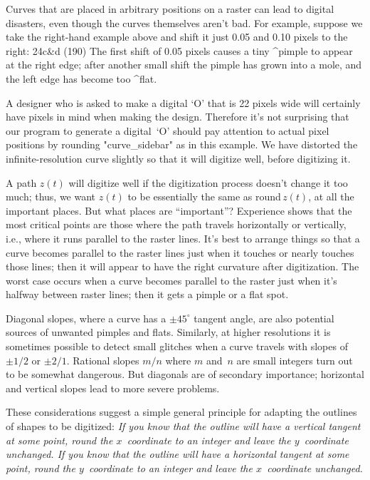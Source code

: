 \danger Curves that are placed in arbitrary positions on
a raster can lead to digital disasters, even though the curves themselves
aren't bad. For example, suppose we take the right-hand example above
and shift it just 0.05 and 0.10 pixels to the right:
\displayfig 24c\&d (190\apspix)
The first shift of 0.05 pixels causes a tiny ^{pimple} to appear
at the right edge; after another small shift the pimple has grown into a
mole, and the left edge has become too ^{flat}. 

\danger A designer who is asked to make a digital `O' that is 22 pixels
wide will certainly have pixels in mind when making the design. Therefore
it's not surprising that our program to generate a digital~`O' should
pay attention to actual pixel positions by rounding "curve\_sidebar" as
in this example. We have distorted the infinite-resolution curve
slightly so that it will digitize well, before digitizing it.

\danger A path $z(t)$ will digitize well if the digitization process doesn't
change it too much; thus, we want $z(t)$ to be essentially the same as
round$\,z(t)$, at all the important places. But what places are ``important''?
Experience shows that the most critical points are those where the path
travels horizontally or vertically, i.e., where it runs parallel to
the raster lines. It's best to arrange things so that a curve becomes
parallel to the raster lines just when it touches or nearly touches those
lines; then it will appear to have the right curvature after digitization.
The worst case occurs when a curve becomes parallel to the raster just
when it's halfway between raster lines; then it gets a pimple or a flat spot.

\ddanger Diagonal slopes, where a curve has a $\pm45^\circ$ tangent angle,
are also potential sources of unwanted pimples and flats. Similarly, at
higher resolutions it is sometimes possible to detect small glitches
when a curve travels with slopes of $\pm1/2$ or $\pm2/1$. Rational
slopes $m/n$ where $m$ and~$n$ are small integers turn out to be
somewhat dangerous.  But diagonals are of secondary importance; horizontal
and vertical slopes lead to more severe problems.

\danger These considerations suggest a simple general principle for adapting
the outlines of shapes to be digitized:  {\sl If you know that the outline
will have a vertical tangent at some point, round the $x$~coordinate to an
integer and leave the $y$~coordinate unchanged.  If you know that the
outline will have a horizontal tangent at some point, round the
$y$~coordinate to an integer and leave the $x$~coordinate unchanged.}

